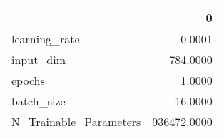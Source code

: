 \begin{tabular}{lr}
\toprule
{} &            0 \\
\midrule
learning\_rate          &       0.0001 \\
input\_dim              &     784.0000 \\
epochs                 &       1.0000 \\
batch\_size             &      16.0000 \\
N\_Trainable\_Parameters &  936472.0000 \\
\bottomrule
\end{tabular}
